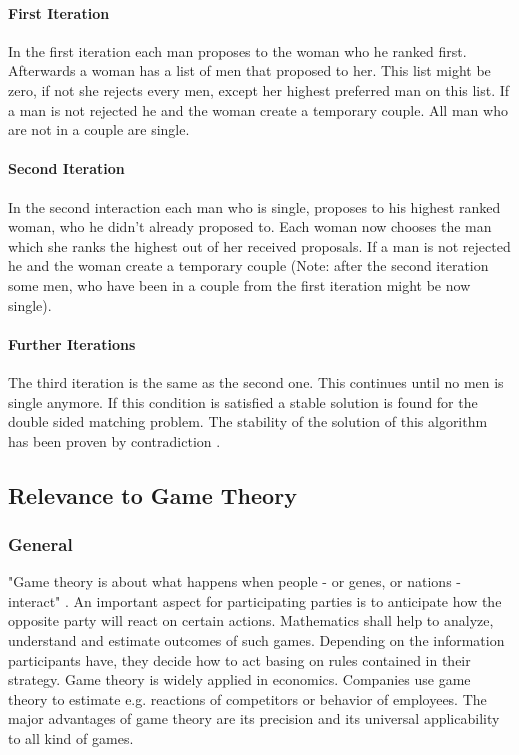 \paragraph{First Iteration\\}
In the first iteration each man proposes to the woman who he ranked first.
Afterwards a woman has a list of men that proposed to her. This list might be zero, if not she rejects every men, except her highest preferred man on this list.
If a man is not rejected he and the woman create a temporary couple.
All man who are not in a couple are single.

\paragraph{Second Iteration\\}
In the second interaction each man who is single, proposes to his highest ranked woman, who he didn't already proposed to.
Each woman now chooses the man which she ranks the highest out of her received proposals.
If a man is not rejected he and the woman create a temporary couple (Note: after the second iteration some men, who have been in a couple from the first iteration might be now single).

\paragraph{Further Iterations\\}
The third iteration is the same as the second one.
This continues until no men is single anymore.
If this condition is satisfied a stable solution is found for the double sided matching problem.
The stability of the solution of this algorithm has been proven by contradiction \cite{gale62a}.

\subsection{Relevance to Game Theory}

\subsubsection{General}
"Game theory is about what happens when people - or genes, or nations - interact" \cite[p. 1]{camerer2003behavioral}.
An important aspect for participating parties is to anticipate how the opposite party will react on certain actions.
Mathematics shall help to analyze, understand and estimate outcomes of such games. 
Depending on the information participants have, they decide how to act basing on rules contained in their strategy.
Game theory is widely applied in economics.
Companies use game theory to estimate e.g. reactions of competitors or behavior of employees.
The major advantages of game theory are its precision and its universal applicability to all kind of games. \cite[pp. 1-2]{camerer2003behavioral}

